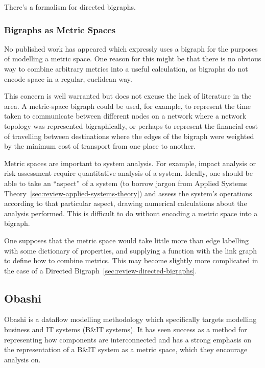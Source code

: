 \documentclass[draft,12pt]{article}
\begin{document}
There's a formalism for directed bigraphs. 

\subsubsection{Bigraphs as Metric Spaces}

No published work has appeared which expressly uses a bigraph for the purposes
of modelling a metric space. One reason for this might be that there is no
obvious way to combine arbitrary metrics into a useful calculation, as bigraphs
do not encode space in a regular, euclidean way.
\par

This concern is well warranted but does not excuse the lack of literature in the
area. A metric-space bigraph could be used, for example, to represent the time
taken to communicate between different nodes on a network where a network
topology was represented bigraphically, or perhaps to represent the financial
cost of travelling between destinations where the edges of the bigraph were
weighted by the minimum cost of transport from one place to another.
\par

Metric spaces are important to system analysis. For example, impact analysis or
risk assessment require quantitative analysis of a system. Ideally, one should
be able to take an ``aspect'' of a system (to borrow jargon from Applied Systems
Theory~\ref{sec:review-applied-systems-theory}) and assess the system's
operations according to that particular aspect, drawing numerical calculations
about the analysis performed. This is difficult to do without encoding a metric
space into a bigraph.
\par

One supposes that the metric space would take little more than edge labelling
with some dictionary of properties, and supplying a function with the link graph
to define how to combine metrics. This may become slightly more complicated in
the case of a Directed Bigraph~\ref{sec:review-directed-bigraphs}.
\par

\subsection{Obashi}

Obashi is a dataflow modelling methodology which specifically targets modelling
business and IT systems (B\&IT systems). It has seen success as a method for
representing how components are interconnected and has a strong emphasis on the
representation of a B\&IT system as a metric space, which they encourage analysis
on.
\par
\end{document}

